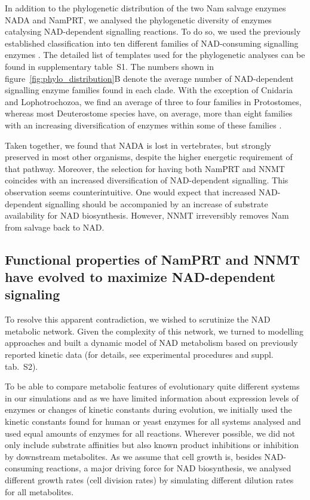 In addition to the phylogenetic distribution of the two Nam salvage enzymes NADA and NamPRT, we analysed the phylogenetic diversity of enzymes catalysing NAD-dependent signalling reactions. To do so, we used the previously established classification into ten different families of NAD-consuming signalling enzymes \cite{Gossmann2012FEBS}. The detailed list of templates used for the phylogenetic analyses can be found in supplementary table~S1. The numbers shown in figure~\ref{fig:phylo_distribution}B denote the average number of NAD-dependent signalling enzyme families found in each clade. With the exception of Cnidaria and Lophotrochozoa, we find an average of three to four families in Protostomes, whereas most Deuterostome species have, on average, more than eight families with an increasing diversification of enzymes within some of these families \cite{Gossmann2014DNAR}.

Taken together, we found that NADA is lost in vertebrates, but strongly preserved in most other organisms, despite the higher energetic requirement of that pathway. Moreover, the selection for having both NamPRT and NNMT coincides with an increased diversification of NAD-dependent signalling. This observation seems counterintuitive. One would expect that increased NAD-dependent signalling should be accompanied by an increase of substrate availability for NAD biosynthesis. However, NNMT irreversibly removes Nam from salvage back to NAD.


\subsection{Functional properties of NamPRT and NNMT have evolved to maximize NAD-dependent signaling}

To resolve this apparent contradiction, we wished to scrutinize the NAD metabolic network. Given the complexity of this network, we turned to modelling approaches and built a dynamic model of NAD metabolism based on previously reported kinetic data (for details, see experimental procedures and suppl. tab.~S2).

To be able to compare metabolic features of evolutionary quite different systems in our simulations and as we have limited information about expression levels of enzymes or changes of kinetic constants during evolution, we initially used the kinetic constants found for human or yeast enzymes for all systems analysed and used equal amounts of enzymes for all reactions. Wherever possible, we did not only include substrate affinities but also known product inhibitions or inhibition by downstream metabolites. As we assume that cell growth is, besides NAD-consuming reactions, a major driving force for NAD biosynthesis, we analysed different growth rates (cell division rates) by simulating different dilution rates for all metabolites.

